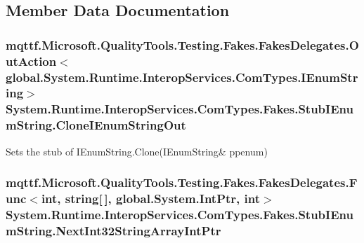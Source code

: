\subsection{Member Data Documentation}
\hypertarget{class_system_1_1_runtime_1_1_interop_services_1_1_com_types_1_1_fakes_1_1_stub_i_enum_string_ae41403607231b8f9669498f77763ca0c}{
\subsubsection[{Clone\-I\-Enum\-String\-Out}]{\setlength{\rightskip}{0pt plus 5cm}mqttf.\-Microsoft.\-Quality\-Tools.\-Testing.\-Fakes.\-Fakes\-Delegates.\-Out\-Action$<$global.\-System.\-Runtime.\-Interop\-Services.\-Com\-Types.\-I\-Enum\-String$>$ System.\-Runtime.\-Interop\-Services.\-Com\-Types.\-Fakes.\-Stub\-I\-Enum\-String.\-Clone\-I\-Enum\-String\-Out}}\label{class_system_1_1_runtime_1_1_interop_services_1_1_com_types_1_1_fakes_1_1_stub_i_enum_string_ae41403607231b8f9669498f77763ca0c}


Sets the stub of I\-Enum\-String.\-Clone(I\-Enum\-String\& ppenum)

\hypertarget{class_system_1_1_runtime_1_1_interop_services_1_1_com_types_1_1_fakes_1_1_stub_i_enum_string_af6e7e3ea07ccdf572ae42b46963c26bc}{
\subsubsection[{Next\-Int32\-String\-Array\-Int\-Ptr}]{\setlength{\rightskip}{0pt plus 5cm}mqttf.\-Microsoft.\-Quality\-Tools.\-Testing.\-Fakes.\-Fakes\-Delegates.\-Func$<$int, string\mbox{[}$\,$\mbox{]}, global.\-System.\-Int\-Ptr, int$>$ System.\-Runtime.\-Interop\-Services.\-Com\-Types.\-Fakes.\-Stub\-I\-Enum\-String.\-Next\-Int32\-String\-Array\-Int\-Ptr}}\label{class_system_1_1_runtime_1_1_interop_services_1_1_com_types_1_1_fakes_1_1_stub_i_enum_string_af6e7e3ea07ccdf572ae42b46963c26bc}


